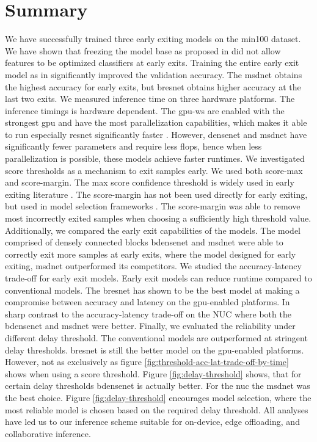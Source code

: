 \section{Summary} \label{sec:ee-summary}
We have successfully trained three early exiting models on the \gls{min100} dataset. We have shown that freezing the model base as proposed in \cite{leroux_resource-constrained_2015} did not allow features to be optimized classifiers at early exits. Training the entire early exit model as in \cite{teerapittayanon_branchynet:_2016} significantly improved the validation accuracy. The \gls{msdnet} obtains the highest accuracy for early exits, but \gls{bresnet} obtains higher accuracy at the last two exits. 
We measured inference time on three hardware platforms. The inference timings is hardware dependent. The \gls{gpu-ws} are enabled with the strongest \gls{gpu} and have the most parallelization capabilities, which makes it able to run especially \gls{resnet} significantly faster \cite{lee_energy_2019}. However, \gls{densenet} and \gls{msdnet} have significantly fewer parameters and require less \gls{flop}s, hence when less parallelization is possible, these models achieve faster runtimes.
We investigated score thresholds as a mechanism to exit samples early. We used both score-max and score-margin. The max score confidence threshold is widely used in early exiting literature \cite{leroux_resource-constrained_2015, leroux_cascading_2017, kaya_shallow-deep_nodate, berestizshevsky_sacrificing_2019}. The score-margin has not been used directly for early exiting, but used in model selection frameworks \cite{park_big/little_2015,tann_flexible_2018}. The score-margin was able to remove most incorrectly exited samples when choosing a sufficiently high threshold value. Additionally, we compared the early exit capabilities of the models. The model comprised of densely connected blocks \gls{bdensenet} and \gls{msdnet} were able to correctly exit more samples at early exits, where the model designed for early exiting, \gls{msdnet} outperformed its competitors. 
We studied the accuracy-latency trade-off for early exit models. Early exit models can reduce runtime compared to conventional models. The \gls{bresnet} has shown to be the best model at making a compromise between accuracy and latency on the \gls{gpu}-enabled platforms. In sharp contrast to the accuracy-latency trade-off on the NUC where both the \gls{bdensenet} and \gls{msdnet} were better.
Finally, we evaluated the reliability under different delay threshold. The conventional models are outperformed at stringent delay thresholds. \gls{bresnet} is still the better model on the \gls{gpu}-enabled platforms. However, not as exclusively as figure \ref{fig:threshold-acc-lat-trade-off-by-time} shows when using a score threshold. Figure \ref{fig:delay-threshold} shows, that for certain delay thresholds \gls{bdensenet} is actually better. For the \gls{nuc} the \gls{msdnet} was the best choice.
Figure \ref{fig:delay-threshold} encourages model selection, where the most reliable model is chosen based on the required delay threshold. All analyses have led us to our inference scheme suitable for on-device, edge offloading, and collaborative inference. 
